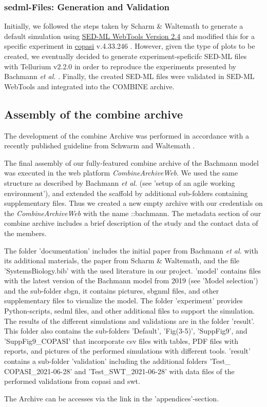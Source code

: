 \subsubsection*{\acs{sedml}-Files: Generation and Validation}
Initially, we followed the steps taken by Scharm \& Waltemath \cite{combine} to generate a default simulation using \hyperlink{http://sysbioapps.spdns.org/SED-ML_Web_Tools}{SED-ML WebTools Version 2.4} and modified this for a specific experiment in \hyperlink{http://copasi.org/}{\ac{copasi}} v.4.33.246 \cite{copasi}. However, given the type of plots to be created, we eventually decided to generate experiment-speficifc SED-ML files with Tellurium v2.2.0 \cite{tellurium} in order to reproduce the experiments presented by Bachmann \textit{et al.} \cite{bachmannmodel}. Finally, the created SED-ML files were validated in SED-ML WebTools and integrated into the COMBINE archive.

\subsection*{Assembly of the \acs{combine} archive}

The development of the \ac{combine} Archive was performed in accordance with a recently published guideline from Schwarm and Waltemath \cite{combine}.

The final assembly of our fully-featured \ac{combine} archive of the Bachmann model was executed in the web platform \textit{CombineArchiveWeb}. We used the same structure as described by Bachmann \textit{et al.} (see 'setup of an agile working environment'), and extended the scaffold by additional sub-folders containing supplementary files. Thus we created a new empty archive with our credentials on the \textit{CombineArchiveWeb} with the name \textsf{::bachmann}. The metadata section of our \ac{combine} archive includes a brief description of the study and the contact data of the members.

The folder 'documentation' includes the initial paper from Bachmann \textit{et al.}  with its additional materials, the paper from Scharm \& Waltemath, and the file 'SystemsBiology.bib' with the used literature in our project. 'model' contains files with the latest version of the Bachmann model from 2019 (see 'Model selection') and the sub-folder \textsf{sbgn}, it contains pictures, \ac{sbgnml} files, and other supplementary files to visualize the model. The folder 'experiment' provides Python-scripts, \ac{sedml} files, and other additional files to support the simulation. The results of the different simulations and validations are in the folder 'result'. This folder also contains the sub-folders 'Default', 'Fig(3-5)', 'SuppFig9', and 'SuppFig9\_COPASI' that incorporate \ac{csv} files with tables, PDF files with reports, and pictures of the performed simulations with different tools.  'result' contains a sub-folder 'validation'  including the additional folders 'Test\_ COPASI\_2021-06-28' and 'Test\_SWT\_2021-06-28' with data files of the performed validations from \ac{copasi} and \ac{swt}.

The Archive can be accesses via the link in the 'appendices'-section.